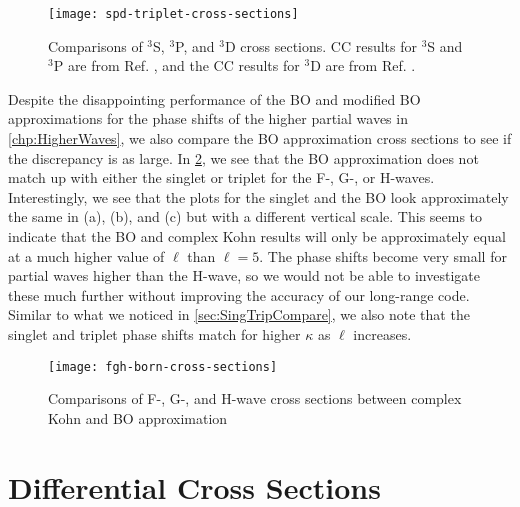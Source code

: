 \documentclass[Dissertation.tex]{subfiles}
\begin{document}
\begin{figure}
	\centering
	\texttt{[image: spd-triplet-cross-sections]}
	\caption[Comparisons of $^3$S, $^3$P, and $^3$D cross sections.]{Comparisons of $^3$S, $^3$P, and $^3$D cross sections. CC results for $^3$S and $^3$P are from Ref. \cite{Walters2004}, and the CC results for $^3$D are from Ref. \cite{Blackwood2002}.}
	\label{fig:spd-triplet-cross-sections}
\end{figure}

Despite the disappointing performance of the BO and modified BO
approximations for the phase shifts of the higher partial waves in
\cref{chp:HigherWaves}, we also compare the BO approximation cross sections
to see if the discrepancy is as large. In \cref{fig:fgh-born-cross-sections},
we see that the BO approximation does not match up with either the singlet
or triplet for the F-, G-, or H-waves. Interestingly, we see that the plots
for the singlet and the BO look approximately the same in (a), (b), and (c)
but with a different vertical scale. This seems to indicate that the BO and complex
Kohn results will only be approximately equal at a much higher value of $\ell$
than $\ell = 5$. The phase shifts become very small for partial waves higher
than the H-wave, so we would not be able to investigate these much further 
without improving the accuracy of our long-range code. Similar to what we
noticed in \cref{sec:SingTripCompare}, we also note that the singlet and
triplet phase shifts match for higher $\kappa$ as $\ell$ increases.

\begin{figure}
	\centering
	\texttt{[image: fgh-born-cross-sections]}
	\caption[Comparisons of F-, G-, and H-wave cross sections]{Comparisons of F-, G-, and H-wave cross sections between complex Kohn and BO approximation}
	\label{fig:fgh-born-cross-sections}
\end{figure}


\section{Differential Cross Sections}
\label{sec:diffcross}
\end{document}
